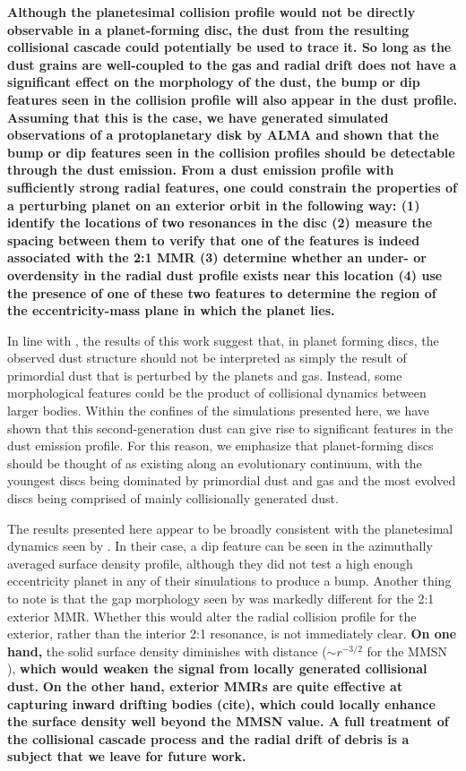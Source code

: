 \documentclass[fleqn,usenatbib]{mnras}
\begin{document}
\textbf{Although the planetesimal collision profile would not be directly observable in a planet-forming disc, the dust from the resulting collisional cascade could potentially be used to trace it. So long as the dust grains are well-coupled to the gas and radial drift does not have a significant effect on the morphology of the dust, the bump or dip features seen in the collision profile will also appear in the dust profile. Assuming that this is the case, we have generated simulated observations of a protoplanetary disk by ALMA and shown that the bump or dip features seen in the collision profiles should be detectable through the dust emission. From a dust emission profile with sufficiently strong radial features, one could constrain the properties of a perturbing planet on an exterior orbit in the following way: (1) identify the locations of two resonances in the disc (2) measure the spacing between them to verify that one of the features is indeed associated with the 2:1 MMR (3) determine whether an under- or overdensity in the radial dust profile exists near this location (4) use the presence of one of these two features to determine the region of the eccentricity-mass plane in which the planet lies.}

In line with \citet{2017ApJ...850..103B}, the results of this work suggest that, in planet forming discs, the observed dust structure should not be 
interpreted as simply the result of primordial dust that is perturbed by the planets and gas. Instead, some morphological features could be the product 
of collisional dynamics between larger bodies. Within the confines of the simulations presented here, we have shown that this second-generation dust 
can give rise to significant features in the dust emission profile. For this reason, we emphasize that planet-forming discs should be thought of as 
existing along an evolutionary continuum, with the youngest discs being dominated by primordial dust and gas and the most evolved discs being 
comprised of mainly collisionally generated dust.

The results presented here appear to be broadly consistent with the planetesimal dynamics seen by \citet{2016ApJ...818..159T}. In their case, a dip 
feature can be seen in the azimuthally averaged surface density profile, although they did not test a high enough eccentricity planet in any of their 
simulations to produce a bump. Another thing to note is that the gap morphology seen by \citet{2016ApJ...818..159T} was markedly different for the 
2:1 exterior MMR. Whether this would alter the radial collision profile for the exterior, rather than the interior 2:1 resonance, is not immediately clear.  
\textbf{On one hand,} the solid surface density diminishes with distance ($\sim r^{-3/2}$ for the MMSN \citep{1981PThPS..70...35H}), \textbf{which would weaken the signal from locally generated collisional dust.} \textbf{On the other hand, exterior MMRs are quite effective at capturing inward drifting bodies (cite), which could locally enhance the surface density well beyond the MMSN value. A full treatment of the collisional cascade process and the radial drift of debris is a subject that we leave for future work.}
\end{document}
